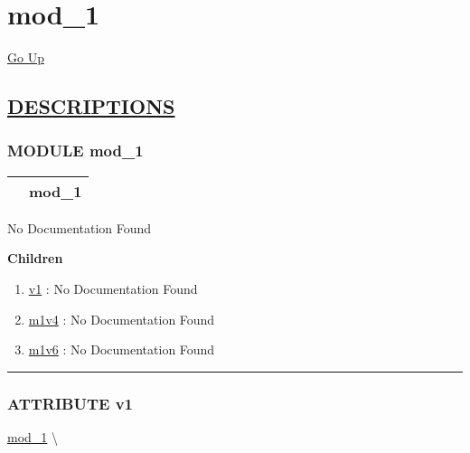 \chapter*{\color{headfile}
mod_1
}
\hypertarget{ecldoc:toc:mod_1}{}
\hyperlink{ecldoc:toc:root}{Go Up}


\section*{\underline{\textsf{DESCRIPTIONS}}}
\subsection*{\textsf{\colorbox{headtoc}{\color{white} MODULE}
mod\_1}}

\hypertarget{ecldoc:mod_1}{}

{\renewcommand{\arraystretch}{1.5}
\begin{tabularx}{\textwidth}{|>{\raggedright\arraybackslash}l|X|}
\hline
\hspace{0pt}\mytexttt{\color{red} } & \textbf{mod\_1} \\
\hline
\end{tabularx}
}

\par





No Documentation Found







\textbf{Children}
\begin{enumerate}
\item \hyperlink{ecldoc:mod_1.v1}{v1}
: No Documentation Found
\item \hyperlink{ecldoc:mod_1.m1v4}{m1v4}
: No Documentation Found
\item \hyperlink{ecldoc:mod_1.m1v6}{m1v6}
: No Documentation Found
\end{enumerate}

\rule{\linewidth}{0.5pt}

\subsection*{\textsf{\colorbox{headtoc}{\color{white} ATTRIBUTE}
v1}}

\hypertarget{ecldoc:mod_1.v1}{}
\hspace{0pt} \hyperlink{ecldoc:mod_1}{mod_1} \textbackslash 

